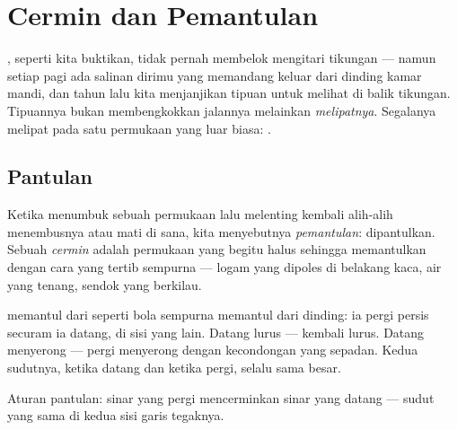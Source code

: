 \chapter{Cermin dan Pemantulan}\label{ch:g5:mirrors-reflection}

, seperti kita buktikan, tidak pernah membelok mengitari
tikungan --- namun setiap pagi ada salinan dirimu yang memandang
keluar dari dinding kamar mandi, dan tahun lalu kita menjanjikan
tipuan untuk melihat di balik tikungan. Tipuannya bukan
membengkokkan jalannya melainkan \emph{melipatnya}. Segalanya melipat
pada satu permukaan yang luar biasa: .

\section{Pantulan}

\begin{definition}[Pemantulan]\label{def:g5:mirrors-reflection:reflection}
Ketika  menumbuk sebuah permukaan lalu melenting kembali
alih-alih menembusnya atau mati di sana, kita menyebutnya
\emph{pemantulan}:  dipantulkan. Sebuah
\emph{cermin} adalah permukaan yang begitu halus
sehingga memantulkan  dengan cara yang tertib sempurna --- logam
yang dipoles di belakang kaca, air yang tenang, sendok yang berkilau.
\end{definition}

\begin{proposition}\label{prop:g5:mirrors-reflection:bounce}
 memantul dari  seperti bola sempurna memantul dari
dinding: ia pergi persis securam ia datang, di sisi yang lain. Datang
lurus --- kembali lurus. Datang menyerong --- pergi menyerong dengan
kecondongan yang sepadan. Kedua sudutnya, ketika datang dan ketika
pergi, selalu sama besar.
\end{proposition}

\begin{omfigure}

{\small Aturan pantulan: sinar yang pergi mencerminkan sinar yang
datang --- sudut yang sama di kedua sisi garis tegaknya.}
\end{omfigure}

